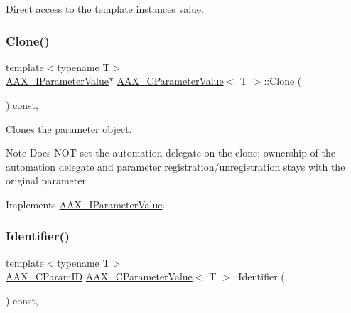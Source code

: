 Direct access to the template instance\textquotesingle{}s value. 

\mbox{\label{a01533_a6618ae2833e64a3b75752cdbb02d6332}} 
\subsubsection{\texorpdfstring{Clone()}{Clone()}}
{\footnotesize\ttfamily template$<$typename T$>$ \\
\mbox{\hyperlink{a01853}{A\+A\+X\+\_\+\+I\+Parameter\+Value}}$\ast$ \mbox{\hyperlink{a01533}{A\+A\+X\+\_\+\+C\+Parameter\+Value}}$<$ T $>$\+::Clone (\begin{DoxyParamCaption}{ }\end{DoxyParamCaption}) const\hspace{0.3cm}{\ttfamily [inline]}, {\ttfamily [virtual]}}



Clones the parameter object. 

\begin{DoxyNote}{Note}
Does N\+OT set the automation delegate on the clone; ownership of the automation delegate and parameter registration/unregistration stays with the original parameter 
\end{DoxyNote}


Implements \mbox{\hyperlink{a01853_a23ebf3322f5ded89954a5e220d2e717f}{A\+A\+X\+\_\+\+I\+Parameter\+Value}}.

\mbox{\label{a01533_ac775643998370e9b70dfac23e8a542c6}} 
\subsubsection{\texorpdfstring{Identifier()}{Identifier()}}
{\footnotesize\ttfamily template$<$typename T$>$ \\
\mbox{\hyperlink{a00392_a1440c756fe5cb158b78193b2fc1780d1}{A\+A\+X\+\_\+\+C\+Param\+ID}} \mbox{\hyperlink{a01533}{A\+A\+X\+\_\+\+C\+Parameter\+Value}}$<$ T $>$\+::Identifier (\begin{DoxyParamCaption}{ }\end{DoxyParamCaption}) const\hspace{0.3cm}{\ttfamily [inline]}, {\ttfamily [virtual]}}



